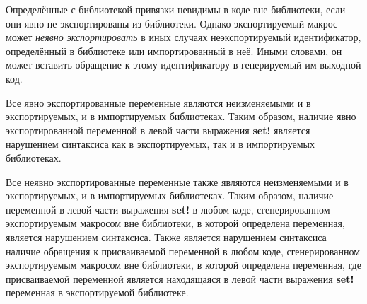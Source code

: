 Определённые с библиотекой привязки невидимы в коде вне библиотеки, если они явно не
экспортированы из библиотеки. Однако экспортируемый макрос может \emph{неявно экспортировать}
в иных случаях неэкспортируемый идентификатор, определённый в библиотеке или
импортированный в неё. Иными словами, он может вставить обращение к этому идентификатору
в генерируемый им выходной код.\vspace{-1.2mm}

\label{importsareimmutablesection}
Все явно экспортированные переменные являются неизменяемыми и в экспортируемых, и в импортируемых
библиотеках. Таким образом, наличие явно экспортированной переменной в левой части выражения
{\cf\bfseries set!} является нарушением синтаксиса как в экспортируемых, так и в импортируемых
библиотеках.\vspace{-1.2mm}

Все неявно экспортированные переменные также являются неизменяемыми и в экспортируемых, и в
импортируемых библиотеках. Таким образом, наличие переменной в левой части выражения
{\cf\bfseries set!} в любом коде, сгенерированном экспортируемым макросом вне библиотеки, в
которой определена переменная, является нарушением синтаксиса. Также является нарушением
синтаксиса наличие обращения к присваиваемой переменной в любом коде, сгенерированном
экспортируемым макросом вне библиотеки, в которой определена переменная, где присваиваемой
переменной является находящаяся в левой части выражения {\cf\bfseries set!} переменная в
экспортируемой библиотеке.\vspace{-1.2mm}

